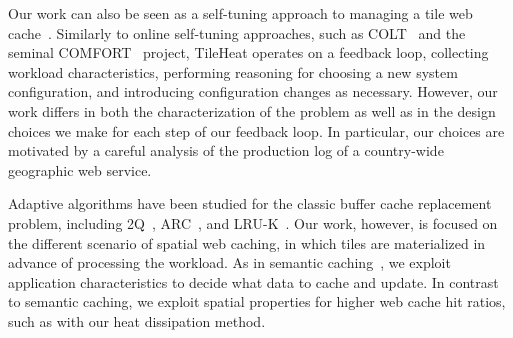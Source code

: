 \documentclass[11pt, oneside]{report}
\begin{document}
Our work can also be seen as a self-tuning approach to managing a tile web cache~\cite{CN07:SelfTuning10YrPaper}. Similarly to online self-tuning approaches, such as COLT~\cite{SAMP07:COLT} and the seminal COMFORT~\cite{WHMZ94:COMFORT} project, TileHeat operates on a feedback loop, collecting workload characteristics, performing reasoning for choosing a new system configuration, and introducing configuration changes as necessary. However, our work differs in both the characterization of the problem as well as in the design choices we make for each step of our feedback loop. 
In particular, our choices are motivated by a careful analysis of the production log of a country-wide geographic web service. 

Adaptive algorithms have been studied for the classic buffer cache replacement problem, including 2Q~\cite{JS94:2Q}, ARC~\cite{MM03:ARC}, and LRU-K~\cite{OOW93:LRU-K}. Our work, however, is focused on the different scenario of spatial web caching, in which tiles are materialized in advance of processing the workload.
As in semantic caching~\cite{DFJ+96:SemanticCaching}, we exploit application characteristics to decide what data to cache and update. In contrast to semantic caching, we exploit spatial properties for higher web cache hit ratios, such as with our heat dissipation method. 
	
\end{document}
